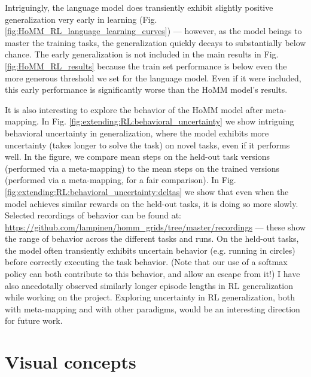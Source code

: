 Intriguingly, the language model does transiently exhibit slightly positive generalization very early in learning (Fig. \ref{fig:HoMM_RL_language_learning_curves}) --- however, as the model beings to master the training tasks, the generalization quickly decays to substantially below chance. The early generalization is not included in the main results in Fig. \ref{fig:HoMM_RL_results} because the train set performance is below even the more generous threshold we set for the language model. Even if it were included, this early performance is significantly worse than the HoMM model's results. \par

It is also interesting to explore the behavior of the HoMM model after meta-mapping. In Fig. \ref{fig:extending:RL:behavioral_uncertainty} we show intriguing behavioral uncertainty in generalization, where the model exhibits more uncertainty (takes longer to solve the task) on novel tasks, even if it performs well. In the figure, we compare mean steps on the held-out task versions (performed via a meta-mapping) to the mean steps on the trained versions (performed via a meta-mapping, for a fair comparison). In Fig. \ref{fig:extending:RL:behavioral_uncertainty:deltas} we show that even when the model achieves similar rewards on the held-out tasks, it is doing so more slowly. Selected recordings of behavior can be found at: \url{https://github.com/lampinen/homm_grids/tree/master/recordings} --- these show the range of behavior across the different tasks and runs. On the held-out tasks, the model often transiently exhibits uncertain behavior (e.g. running in circles) before correctly executing the task behavior. (Note that our use of a softmax policy can both contribute to this behavior, and allow an escape from it!) I have also anecdotally observed similarly longer episode lengths in RL generalization while working on the \citet{Hill2019a} project. Exploring uncertainty in RL generalization, both with meta-mapping and with other paradigms, would be an interesting direction for future work.




\section{Visual concepts} \label{sec:extending:concepts}

